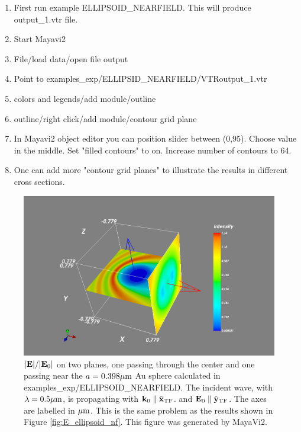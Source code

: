 \begin{enumerate}
\item First run example ELLIPSOID\_NEARFIELD. This will produce
      output\_1.vtr file. 
\item Start Mayavi2
\item File/load data/open file output
\item Point to examples\_exp/ELLIPSID\_NEARFIELD/VTRoutput\_1.vtr
\item colors and legends/add module/outline
\item outline/right click/add module/contour grid plane
\item In Mayavi2 object editor you can position slider between (0,95).
      Choose value in the middle. Set "filled contours" to on. 
      Increase number of contours to 64.
\item One can add more "contour grid planes" to illustrate the results in
different cross sections.
\end{enumerate}

\begin{figure}
\begin{center}
\includegraphics[width=12.0cm,angle=0]{ellipsoid_nearfield.png}
\caption{\footnotesize
         $|{\bf E}|/|{\bf E}_0|$ on two planes, one passing through the center
         and one passing near the $a=0.398{\mu{\rm m}}$ Au sphere
         calculated in examples\_exp/ELLIPSOID\_NEARFIELD.
         The incident wave, with $\lambda=0.5{\mu{\rm m}}$, 
         is propagating with ${\bf k}_0\parallel\hat{\bf x}_{\rm TF}$.
         and ${\bf E}_0\parallel\hat{\bf y}_{\rm TF}$.
         The axes are labelled in ${\mu{\rm m}}$.
         This is the same problem as the results shown in Figure
         \ref{fig:E_ellipsoid_nf}.
         This figure was generated by MayaVi2.}
\end{center}
\end{figure}

